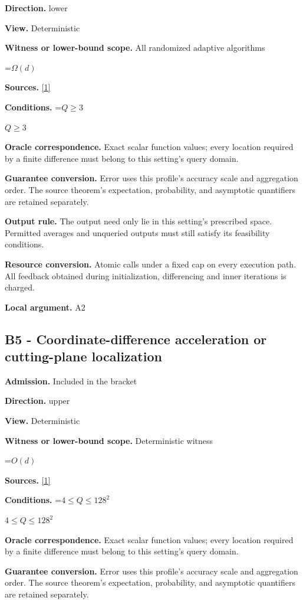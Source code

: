 \documentclass[10pt,a4paper]{article}
\newcommand{\AtlasMath}[1]{\par\begingroup\centering\setbox0=\hbox{$\displaystyle #1$}\ifdim\wd0>1.4\linewidth\typeout{ATLAS WIDE FORMULA: \the\wd0}\fi\ifdim\wd0>\linewidth\resizebox{\linewidth}{!}{\box0}\else\box0\fi\par\endgroup}
\newcommand{\AtlasInlineMath}[1]{\begingroup\setbox0=\hbox{$#1$}\ifdim\wd0>.4\linewidth\endgroup\AtlasMath{#1}\else\endgroup$#1$\fi}
\begin{document}
\textbf{Direction.} lower

\textbf{View.} Deterministic

\textbf{Witness or lower-bound scope.} All randomized adaptive algorithms

\AtlasMath{\Omega(d)}
\textbf{Sources.} \href{https://arxiv.org/html/2610.00345v1}{[1]}

\textbf{Conditions.} \AtlasInlineMath{Q\ge3}

\textbf{Oracle correspondence.} Exact scalar function values; every location required by a finite difference must belong to this setting's query domain.

\textbf{Guarantee conversion.} Error uses this profile's accuracy scale and aggregation order. The source theorem's expectation, probability, and asymptotic quantifiers are retained separately.

\textbf{Output rule.} The output need only lie in this setting's prescribed space. Permitted averages and unqueried outputs must still satisfy its feasibility conditions.

\textbf{Resource conversion.} Atomic calls under a fixed cap on every execution path. All feedback obtained during initialization, differencing and inner iterations is charged.

\textbf{Local argument.} A2

\subsection{B5 - Coordinate-difference acceleration or cutting-plane localization}
\textbf{Admission.} Included in the bracket

\textbf{Direction.} upper

\textbf{View.} Deterministic

\textbf{Witness or lower-bound scope.} Deterministic witness

\AtlasMath{O(d)}
\textbf{Sources.} \href{https://arxiv.org/html/2610.00345v1}{[1]}

\textbf{Conditions.} \AtlasInlineMath{4\le Q\le128^2}

\textbf{Oracle correspondence.} Exact scalar function values; every location required by a finite difference must belong to this setting's query domain.

\textbf{Guarantee conversion.} Error uses this profile's accuracy scale and aggregation order. The source theorem's expectation, probability, and asymptotic quantifiers are retained separately.
\end{document}
